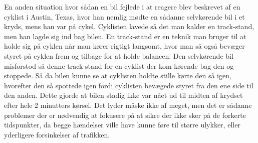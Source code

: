 En anden situation hvor sådan en bil fejlede i at reagere blev beskrevet af en cyklist i Austin, Texas, hvor han nemlig mødte en sådanne selvkørende bil i et kryds, mens han var på cykel. Cyklisten lavede så det man kalder en track-stand, men han lagde sig ind bag bilen. En track-stand er en teknik man bruger til at holde sig på cyklen når man kører rigtigt langsomt, hvor man så også bevæger styret på cyklen frem og tilbage for at holde balancen. Den selvkørende bil misforstod så denne track-stand for en cyklist der kom kørende bag den og stoppede. Så da bilen kunne se at cyklisten holdte stille kørte den så igen, hvorefter den så spottede igen fordi cyklisten bevægede styret fra den ene side til den anden. Dette gjorde at bilen stadig ikke var nået ud til midten af krydset efter hele 2 minutters kørsel\cite{VOX}. Det lyder måske ikke af meget, men det er sådanne problemer der er nødvendig at fokusere på at sikre der ikke sker på de forkerte tidspunkter, da begge hændelser ville have kunne føre til større ulykker, eller yderligere forsinkelser af trafikken. 